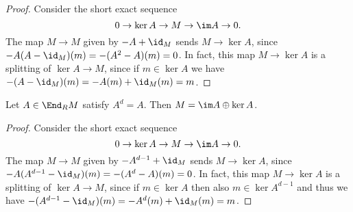 \documentclass{article}
\numberwithin{equation}{section}
\theoremstyle{theorem}
\numberwithin{thm}{section}
\theoremstyle{definition}
\begin{document}
\begin{proof}
Consider the short exact sequence
$$
0\to \ker A \to M \to \im A\to 0.
$$
The map $M\to M$ given by $-A+\id_M$ sends $M\to \ker A$, since $-A(A-\id_M)(m) = -(A^2-A)(m)=0$. In fact, this map $M\to \ker A$ is a splitting of $\ker A\to M$, since if $m\in \ker A$ we have $-(A-\id_M)(m) = -A(m)+\id_M(m)=m$.
\end{proof}

\begin{lem}
Let $A\in \End_R M$ satisfy $A^d=A$. Then $M=\im  A\oplus \ker A$.
\end{lem}

\begin{proof}
Consider the short exact sequence
$$
0\to \ker A \to M \to \im A\to 0.
$$
The map $M\to M$ given by $-A^{d-1}+\id_M$ sends $M\to \ker A$, since $-A(A^{d-1}-\id_M)(m) = -(A^d-A)(m)=0$. In fact, this map $M\to \ker A$ is a splitting of $\ker A\to M$, since if $m\in \ker A$ then also $m\in \ker A^{d-1}$ and thus we have $-(A^{d-1}-\id_M)(m) = -A^d(m)+\id_M(m)=m$.

\end{proof}
\end{document}
